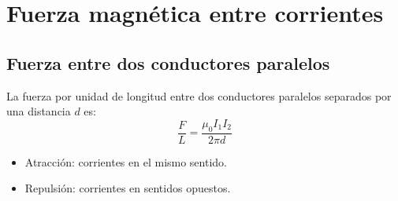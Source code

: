 \section{Fuerza magnética entre corrientes}

\subsection{Fuerza entre dos conductores paralelos}
La fuerza por unidad de longitud entre dos conductores paralelos separados por una distancia \(d\) es:
\begin{equation}
    \frac{F}{L} = \frac{\mu_0 I_1 I_2}{2\pi d}
\end{equation}
\begin{itemize}
    \item Atracción: corrientes en el mismo sentido.
    \item Repulsión: corrientes en sentidos opuestos.
\end{itemize}

